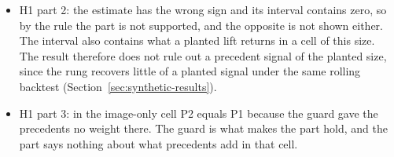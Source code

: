 \begin{itemize}
\item H1 part 2: the estimate has the wrong sign and its interval contains zero, so by the rule the part is not supported, and the opposite is not shown either. The interval also contains what a planted lift returns in a cell of this size. The result therefore does not rule out a precedent signal of the planted size, since the rung recovers little of a planted signal under the same rolling backtest (Section~\ref{sec:synthetic-results}).
\item H1 part 3: in the image-only cell P2 equals P1 because the guard gave the precedents no weight there. The guard is what makes the part hold, and the part says nothing about what precedents add in that cell.

\end{itemize}
